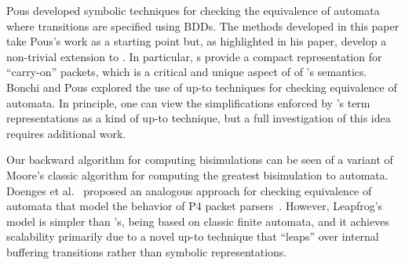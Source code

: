 \documentclass[acmsmall,dvipsnames,nonacm]{acmart}
\begin{document}
Pous \cite{Pous2015} developed symbolic techniques for checking the
equivalence of automata where transitions are specified using
BDDs. The methods developed in this paper take Pous's work as a
starting point but, as highlighted in his paper, develop a non-trivial
extension to \NetKAT. In particular, \SPPn{}s provide a compact
representation for ``carry-on'' packets, which is a critical and
unique aspect of of \NetKAT's semantics. Bonchi and Pous
\cite{Bonchi2013} explored the use of up-to techniques for checking
equivalence of automata. In principle, one can view the
simplifications enforced by \KATch's term representations as a kind of
up-to technique, but a full investigation of this idea requires
additional work.

Our backward algorithm for computing bisimulations can be seen of a
variant of Moore's classic algorithm for computing the greatest
bisimulation to \NetKAT automata.  Doenges et al.~\cite{Doenges2022}
proposed an analogous approach for checking equivalence of automata
that model the behavior of P4 packet
parsers~\cite{Bosshart2014}. However, Leapfrog's model is simpler than
\NetKAT's, being based on classic finite automata, and it achieves
scalability primarily due to a novel up-to technique that ``leaps''
over internal buffering transitions rather than symbolic
representations.



\end{document}
